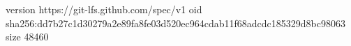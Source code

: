 version https://git-lfs.github.com/spec/v1
oid sha256:dd7b27c1d30279a2e89fa8fe03d520ec964cdab11f68adcdc185329d8bc98063
size 48460
